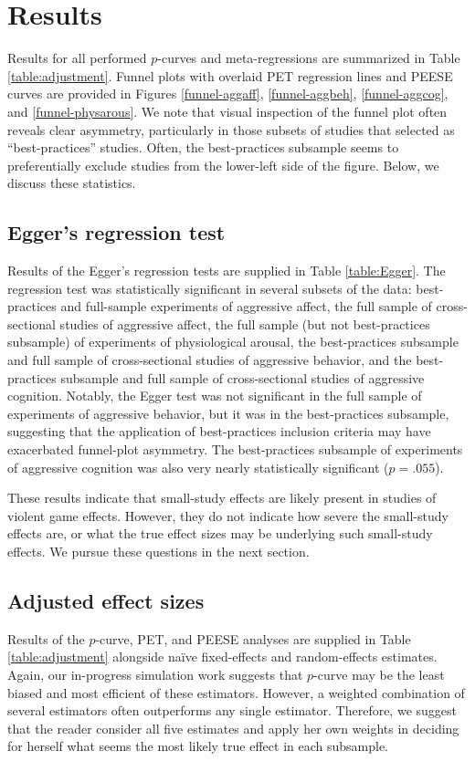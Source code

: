 \documentclass[man]{apa6}
\begin{document}
\section{Results}
Results for all performed $p$-curves and meta-regressions are summarized in Table \ref{table:adjustment}. 
Funnel plots with overlaid PET regression lines and PEESE curves are provided in Figures \ref{funnel-aggaff}, \ref{funnel-aggbeh}, \ref{funnel-aggcog}, and \ref{funnel-physarous}. We note that visual inspection of the funnel plot often reveals clear asymmetry, particularly in those subsets of studies that \citet{Anderson:etal:2010} selected as ``best-practices'' studies. Often, the best-practices subsample seems to preferentially exclude studies from the lower-left side of the figure.
Below, we discuss these statistics.%

\subsection{Egger's regression test}
Results of the Egger's regression tests are supplied in Table \ref{table:Egger}. The regression test was statistically significant in several subsets of the data: best-practices and full-sample experiments of aggressive affect, the full sample of cross-sectional studies of aggressive affect, the full sample (but not best-practices subsample) of experiments of physiological arousal, the best-practices subsample and full sample of cross-sectional studies of aggressive behavior, and the best-practices subsample and full sample of cross-sectional studies of aggressive cognition. Notably, the Egger test was not significant in the full sample of experiments of aggressive behavior, but it was in the best-practices subsample, suggesting that the application of best-practices inclusion criteria may have exacerbated funnel-plot asymmetry. The best-practices subsample of experiments of aggressive cognition was also very nearly statistically significant ($p = .055$).

These results indicate that small-study effects are likely present in studies of violent game effects. However, they do not indicate how severe the small-study effects are, or what the true effect sizes may be underlying such small-study effects. We pursue these questions in the next section.

\subsection{Adjusted effect sizes}
Results of the $p$-curve, PET, and PEESE analyses are supplied in Table \ref{table:adjustment} alongside na{\"i}ve fixed-effects and random-effects estimates. Again, our in-progress simulation work suggests that $p$-curve may be the least biased and most efficient of these estimators. However, a weighted combination of several estimators often outperforms any single estimator. Therefore, we suggest that the reader consider all five estimates and apply her own weights in deciding for herself what seems the most likely true effect in each subsample. 
\end{document}
